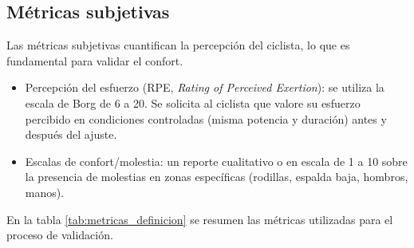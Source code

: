 \subsection{Métricas subjetivas}
\label{ssec:metricas_subjetivas}

Las métricas subjetivas cuantifican la percepción del ciclista, lo que es
fundamental para validar el confort.

\begin{itemize}
      \item Percepción del esfuerzo (RPE, \textit{Rating of Perceived Exertion}): se
            utiliza la escala de Borg de 6 a 20. Se solicita al ciclista que valore su
            esfuerzo percibido en condiciones controladas (misma potencia y duración) antes
            y después del ajuste.
      \item Escalas de confort/molestia: un reporte cualitativo o en escala de 1 a 10 sobre
            la presencia de molestias en zonas específicas (rodillas, espalda baja,
            hombros, manos).
\end{itemize}

En la tabla \ref{tab:metricas_definicion} se resumen las métricas utilizadas
para el proceso de validación.

